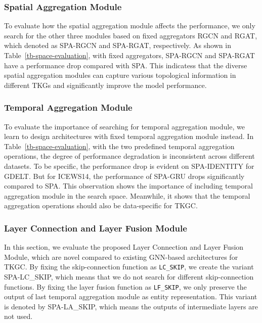 \documentclass[11pt]{article}
\begin{document}
\subsubsection{Spatial Aggregation Module}

To evaluate how the spatial aggregation module affects the performance,
we only search for the other three modules based on fixed aggregators RGCN and RGAT, 
which denoted as SPA-RGCN and SPA-RGAT, respectively. 
As shown in Table~\ref{tb-space-evaluation}, 
with fixed aggregators, 
SPA-RGCN and SPA-RGAT have a performance drop compared with SPA.
This indicatess that 
the diverse spatial aggregation modules can 
capture various topological information in different TKGs and significantly improve the model performance.

\subsubsection{Temporal Aggregation Module}

To evaluate the importance of searching for temporal aggregation module, 
we learn to design architectures with fixed temporal aggregation module instead.
In Table~\ref{tb-space-evaluation}, 
with the two predefined temporal aggregation operations, 
the degree of performance degradation is inconsistent across different datasets.
To be specific,
the performance drop is evident on SPA-IDENTITY for GDELT.
But for ICEWS14, 
the performance of SPA-GRU drops significantly compared to SPA.
This observation shows the importance of including temporal aggregation module in the search space.
Meanwhile, 
it shows that the temporal aggregation operations should also be data-specific for TKGC.

\subsubsection{Layer Connection and Layer Fusion Module}

In this section,
we evaluate the proposed Layer Connection and Layer Fusion Module, 
which are novel compared to existing GNN-based architectures for TKGC.
By fixing the skip-connection function as \texttt{LC\_SKIP}, 
we create the variant SPA-LC\_SKIP,
which means that we do not search for different skip-connection functions.
By fixing the layer fusion function as \texttt{LF\_SKIP}, 
we only preserve the output of last temporal aggregation module as entity representation.
This variant is denoted by SPA-LA\_SKIP, 
which means the outputs of intermediate layers are not used.
\end{document}
